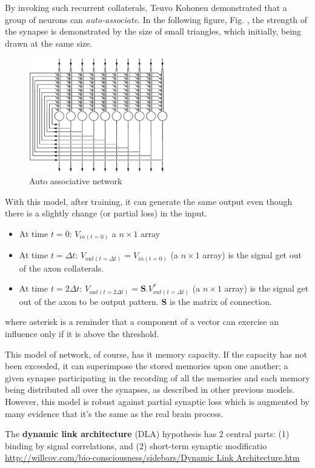 By invoking such recurrent collaterals, Teuvo Kohonen demonstrated
that a group of neurons can {\it auto-associate}. In the following
figure, Fig. , the strength of the synapse is demonstrated by the
size of small triangles, which initially, being drawn at the same
size. 

\begin{figure}[htb]
  \centerline{\includegraphics[height=5cm]{./images/auto_associative_network.eps}}
  \caption{Auto associative network}\label{fig:auto_assoc3}
\end{figure}
With this model, after training, it can generate the same output even
though there is a slightly change (or partial loss) in the input.

\begin{itemize}
\item At time $t = 0$: $V_{in(t=0)}$ a $n\times 1$ array
\item At time $t = \Delta t$: $V_{out(t=\Delta t)} = V_{in(t=0)}$ (a
  $n\times 1$ array) is the signal get out of the axon collaterals.
\item At time $t = 2\Delta t$: $V_{out(t=2\Delta t)} = \mathbf{S}.
  V_{out(t=\Delta t)}^*$ (a $n\times 1$ array) is the signal get out of
  the axon to be output pattern. {\bf S} is the matrix of connection.
\end{itemize}
where asterisk is a reminder that a component of a vector can exercise
an influence only if it is above the threshold.

This model of network, of course, has it memory capacity. If the
capacity has not been exceeded, it can superimpose the stored memories
upon one another; a given synapse participating in the recording of
all the memories and each memory being distributed all over the
synapses, as described in other previous models. However, this model
is robust against partial synaptic loss which is augmented by many
evidence that it's the same as the real brain process.


The {\bf dynamic link architecture} (DLA) hypothesis
has 2 central parts: (1) binding by signal
correlations, and (2) short-term synaptic modificatio
\url{http://willcov.com/bio-consciousness/sidebars/Dynamic Link Architecture.htm}




